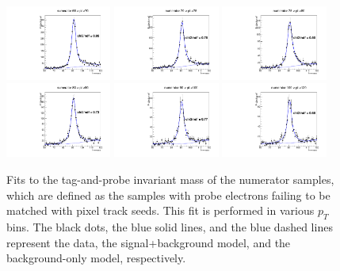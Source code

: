 \documentclass[thesis.tex]{subfiles}
\renewcommand\_{\textunderscore\allowbreak}
\begin{document}
\begin{figure}[hbtp]
   \includegraphics[width=0.31\textwidth]{Figures/Bw_ker_pt_num_65_70.pdf}   \includegraphics[width=0.31\textwidth]{Figures/Bw_ker_pt_num_70_75.pdf} \includegraphics[width=0.31\textwidth]{Figures/Bw_ker_pt_num_75_80.pdf} \\
  \includegraphics[width=0.31\textwidth]{Figures/Bw_ker_pt_num_80_90.pdf} \includegraphics[width=0.31\textwidth]{Figures/Bw_ker_pt_num_90_100.pdf}  \includegraphics[width=0.31\textwidth]{Figures/Bw_ker_pt_num_100_120.pdf} \\
  \caption{Fits to the tag-and-probe invariant mass of the numerator samples, which are defined as the samples with probe electrons failing to be matched with pixel track seeds. This fit is performed in various $p_T$ bins. The black dots, the blue solid lines, and the blue dashed lines
represent the data, the signal+background model, and the background-only model, respectively.} 
 \label{fig:fitAllele-num}
\end{figure}
\end{document}
